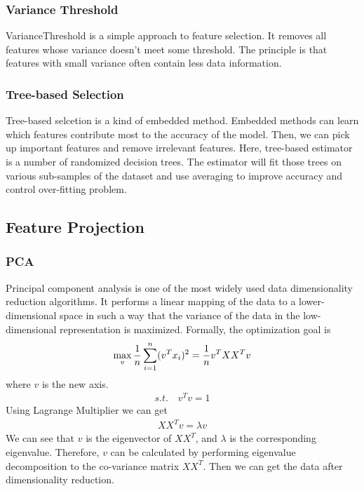 \documentclass{article}
\begin{document}
\subsubsection{Variance Threshold}
\indent VarianceThreshold is a simple approach to feature selection. It removes all features whose variance doesn’t meet some threshold. The principle is that features with small variance often contain less data information.
\subsubsection{Tree-based Selection}
\indent  Tree-based selcetion is a kind of embedded method. Embedded methods can learn which features contribute most to the accuracy of the model. Then, we can pick up important features and remove irrelevant features.
Here, tree-based estimator is a number of randomized decision trees. The estimator will fit those trees on various sub-samples of the dataset and use averaging to improve accuracy and control over-fitting problem.

\subsection{Feature Projection}
\subsubsection{PCA}
\indent Principal component analysis is one of the most widely used data dimensionality reduction algorithms. It performs a linear mapping of the data to a lower-dimensional space in such a way that the variance of the data in the low-dimensional representation is maximized\cite{pearson1901liii}.
Formally, the optimization goal is
\begin{eqnarray}
\centering
\max_v \frac{1}{n}\sum_{i=1}^{n}(v^Tx_i)^2=\frac{1}{n}v^TXX^Tv
\end{eqnarray}
where $v$ is the new axis.
\begin{eqnarray}
s.t.\quad v^Tv=1
\end{eqnarray}
Using Lagrange Multiplier we can get
\begin{eqnarray}
XX^Tv=\lambda v
\end{eqnarray}
We can see that $v$ is the eigenvector of $XX^T$, and $\lambda$ is the corresponding eigenvalue. Therefore, $v$ can be calculated by performing eigenvalue decomposition to the co-variance matrix $XX^T$. Then we can get the data after dimensionality reduction.
\end{document}
